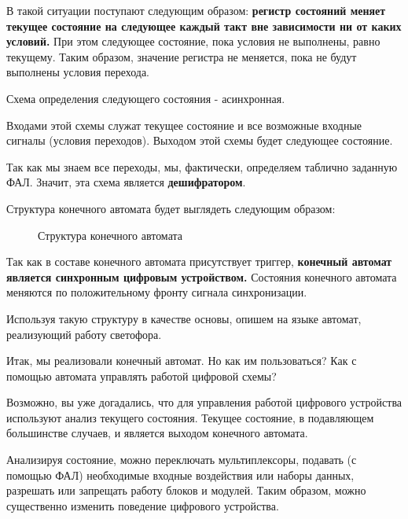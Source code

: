 \par{В такой ситуации поступают следующим образом: \textbf{регистр состояний меняет текущее состояние на следующее каждый такт вне зависимости ни от каких условий.} При этом следующее состояние, пока условия не выполнены, равно текущему. Таким образом, значение регистра не меняется, пока не будут выполнены условия перехода.}

\par{Схема определения следующего состояния - асинхронная.}

\par{Входами этой схемы служат текущее состояние и все возможные входные сигналы (условия переходов). Выходом этой схемы будет следующее состояние.}

\par{Так как мы знаем все переходы, мы, фактически, определяем таблично заданную ФАЛ. Значит, эта схема является \textbf{дешифратором}.}

\par{Структура конечного автомата будет выглядеть следующим образом:}

\begin{figure}[H]
  \centering
  \def\svgwidth{\columnwidth}
  
  \caption{Структура конечного автомата}
\end{figure}

\par{Так как в составе конечного автомата присутствует триггер, \textbf{конечный автомат является синхронным цифровым устройством.} Состояния конечного автомата меняются по положительному фронту сигнала синхронизации.}

\par{Используя такую структуру в качестве основы, опишем на языке  автомат, реализующий работу светофора.}



\par{Итак, мы реализовали конечный автомат. Но как им пользоваться? Как с помощью автомата управлять работой цифровой схемы?}

\par{Возможно, вы уже догадались, что для управления работой цифрового устройства используют анализ текущего состояния. Текущее состояние, в подавляющем большинстве случаев, и является выходом конечного автомата.}

\par{Анализируя состояние, можно переключать мультиплексоры, подавать (с помощью ФАЛ) необходимые входные воздействия или наборы данных, разрешать или запрещать работу блоков и модулей. Таким образом, можно существенно изменить поведение цифрового устройства.}


